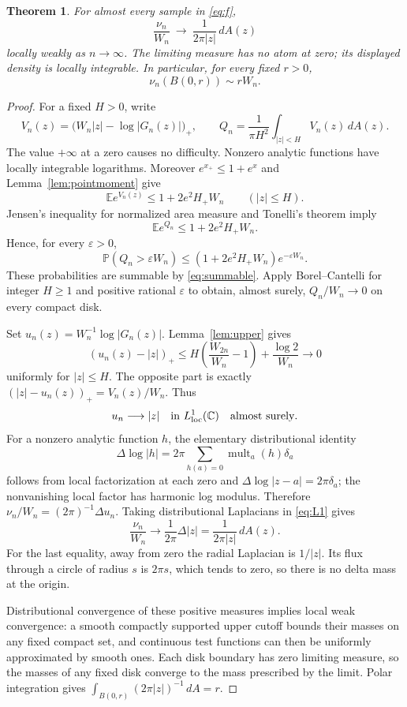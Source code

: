 \documentclass[11pt]{article}
\newtheorem{theorem}{Theorem}
\theoremstyle{remark}
\newcommand{\C}{\mathbb C}
\newcommand{\E}{\mathbb E}
\newcommand{\Prob}{\mathbb P}
\newcommand{\dd}{\,d}
\begin{document}
\begin{theorem}\label{thm:density}
For almost every sample in \eqref{eq:f},
\[
 \frac{\nu_n}{W_n}\ \longrightarrow\
 \frac{1}{2\pi|z|}\dd A(z)
\]
locally weakly as $n\to\infty$. The limiting measure has no atom at
zero; its displayed density is locally integrable.
In particular, for every fixed $r>0$,
\[
 \nu_n(B(0,r))\sim rW_n.
\]
\end{theorem}
\begin{proof}
For a fixed $H>0$, write
\[
 V_n(z)=\bigl(W_n|z|-\log|G_n(z)|\bigr)_+,
 \qquad Q_n=\frac1{\pi H^2}\int_{|z|<H}V_n(z)\dd A(z).
\]
The value $+\infty$ at a zero causes no difficulty. Nonzero analytic
functions have locally integrable logarithms. Moreover
$e^{x_+}\leq1+e^x$ and Lemma~\ref{lem:pointmoment} give
\[
 \E e^{V_n(z)}\leq1+2e^2H_+W_n\qquad(|z|\leq H).
\]
Jensen's inequality for normalized area measure and Tonelli's theorem
imply
\[
 \E e^{Q_n}\leq1+2e^2H_+W_n.
\]
Hence, for every $\varepsilon>0$,
\[
 \Prob(Q_n>\varepsilon W_n)
 \leq(1+2e^2H_+W_n)e^{-\varepsilon W_n}.
\]
These probabilities are summable by \eqref{eq:summable}.
Apply Borel--Cantelli for integer $H\geq1$ and positive rational
$\varepsilon$ to obtain, almost surely, $Q_n/W_n\to0$ on every
compact disk.

Set $u_n(z)=W_n^{-1}\log|G_n(z)|$. Lemma~\ref{lem:upper} gives
\[
 (u_n(z)-|z|)_+\leq
 H\left(\frac{W_{2n}}{W_n}-1\right)+\frac{\log2}{W_n}
 \longrightarrow0
\]
uniformly for $|z|\leq H$. The opposite part is exactly
$(|z|-u_n(z))_+=V_n(z)/W_n$. Thus
\begin{equation}\label{eq:L1}
 u_n\longrightarrow |z|\quad\hbox{in }L^1_{\rm loc}(\C)
 \quad\hbox{almost surely}.
\end{equation}
For a nonzero analytic function $h$, the elementary distributional
identity
\[
 \Delta\log|h|=2\pi\sum_{h(a)=0}\operatorname{mult}_a(h)\delta_a
\]
follows from local factorization at each zero and
$\Delta\log|z-a|=2\pi\delta_a$; the nonvanishing local factor
has harmonic log modulus. Therefore
$\nu_n/W_n=(2\pi)^{-1}\Delta u_n$.
Taking distributional Laplacians in \eqref{eq:L1} gives
\[
 \frac{\nu_n}{W_n}\longrightarrow\frac1{2\pi}\Delta|z|
 =\frac1{2\pi|z|}\dd A(z).
\]
For the last equality, away from zero the radial Laplacian is
$1/|z|$. Its flux through a circle of radius $s$ is $2\pi s$,
which tends to zero, so there is no delta mass at the origin.

Distributional convergence of these positive measures implies local
weak convergence: a smooth compactly supported upper cutoff bounds
their masses on any fixed compact set, and continuous test functions
can then be uniformly approximated by smooth ones. Each disk boundary
has zero limiting measure, so the masses of any fixed disk converge
to the mass prescribed by the limit. Polar integration gives
$\int_{B(0,r)}(2\pi|z|)^{-1}\dd A=r$.
\end{proof}
\end{document}
